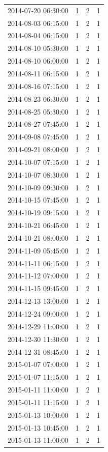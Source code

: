 \begin{tabular}{lrrr}
2014-07-20 06:30:00 & 1 & 2 & 1 \\
2014-08-03 06:15:00 & 1 & 2 & 1 \\
2014-08-04 06:15:00 & 1 & 2 & 1 \\
2014-08-10 05:30:00 & 1 & 2 & 1 \\
2014-08-10 06:00:00 & 1 & 2 & 1 \\
2014-08-11 06:15:00 & 1 & 2 & 1 \\
2014-08-16 07:15:00 & 1 & 2 & 1 \\
2014-08-23 06:30:00 & 1 & 2 & 1 \\
2014-08-25 05:30:00 & 1 & 2 & 1 \\
2014-08-27 07:45:00 & 1 & 2 & 1 \\
2014-09-08 07:45:00 & 1 & 2 & 1 \\
2014-09-21 08:00:00 & 1 & 2 & 1 \\
2014-10-07 07:15:00 & 1 & 2 & 1 \\
2014-10-07 08:30:00 & 1 & 2 & 1 \\
2014-10-09 09:30:00 & 1 & 2 & 1 \\
2014-10-15 07:45:00 & 1 & 2 & 1 \\
2014-10-19 09:15:00 & 1 & 2 & 1 \\
2014-10-21 06:45:00 & 1 & 2 & 1 \\
2014-10-21 08:00:00 & 1 & 2 & 1 \\
2014-11-09 05:45:00 & 1 & 2 & 1 \\
2014-11-11 06:15:00 & 1 & 2 & 1 \\
2014-11-12 07:00:00 & 1 & 2 & 1 \\
2014-11-15 09:45:00 & 1 & 2 & 1 \\
2014-12-13 13:00:00 & 1 & 2 & 1 \\
2014-12-24 09:00:00 & 1 & 2 & 1 \\
2014-12-29 11:00:00 & 1 & 2 & 1 \\
2014-12-30 11:30:00 & 1 & 2 & 1 \\
2014-12-31 08:45:00 & 1 & 2 & 1 \\
2015-01-07 07:00:00 & 1 & 2 & 1 \\
2015-01-07 11:15:00 & 1 & 2 & 1 \\
2015-01-11 11:00:00 & 1 & 2 & 1 \\
2015-01-11 11:15:00 & 1 & 2 & 1 \\
2015-01-13 10:00:00 & 1 & 2 & 1 \\
2015-01-13 10:45:00 & 1 & 2 & 1 \\
2015-01-13 11:00:00 & 1 & 2 & 1 \\

\end{tabular}
